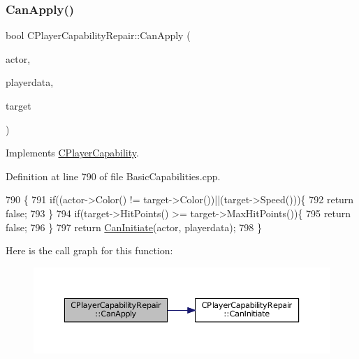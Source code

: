 \subsubsection{\texorpdfstring{Can\+Apply()}{CanApply()}}
{\footnotesize\ttfamily bool C\+Player\+Capability\+Repair\+::\+Can\+Apply (\begin{DoxyParamCaption}\item[{std\+::shared\+\_\+ptr$<$ \hyperlink{classCPlayerAsset}{C\+Player\+Asset} $>$}]{actor,  }\item[{std\+::shared\+\_\+ptr$<$ \hyperlink{classCPlayerData}{C\+Player\+Data} $>$}]{playerdata,  }\item[{std\+::shared\+\_\+ptr$<$ \hyperlink{classCPlayerAsset}{C\+Player\+Asset} $>$}]{target }\end{DoxyParamCaption})\hspace{0.3cm}{\ttfamily [virtual]}}



Implements \hyperlink{classCPlayerCapability_ae96263e0950f496492f8baeb877b9554}{C\+Player\+Capability}.



Definition at line 790 of file Basic\+Capabilities.\+cpp.


\begin{DoxyCode}
790                                                                                                            
                                                   \{
791     \textcolor{keywordflow}{if}((actor->Color() != target->Color())||(target->Speed()))\{
792         \textcolor{keywordflow}{return} \textcolor{keyword}{false};   
793     \}
794     \textcolor{keywordflow}{if}(target->HitPoints() >= target->MaxHitPoints())\{
795         \textcolor{keywordflow}{return} \textcolor{keyword}{false};   
796     \}
797     \textcolor{keywordflow}{return} \hyperlink{classCPlayerCapabilityRepair_a579761cab74d447b95856a24a7841b2e}{CanInitiate}(actor, playerdata);
798 \}
\end{DoxyCode}
Here is the call graph for this function\+:
\nopagebreak
\begin{figure}[H]
\begin{center}
\leavevmode
\includegraphics[width=350pt]{classCPlayerCapabilityRepair_ae989c67c5e14bbba5b2ddda993ee635a_cgraph}
\end{center}
\end{figure}
\hypertarget{classCPlayerCapabilityRepair_a579761cab74d447b95856a24a7841b2e}{}\label{classCPlayerCapabilityRepair_a579761cab74d447b95856a24a7841b2e} 
